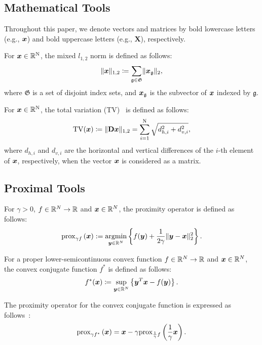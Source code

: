 \subsection{Mathematical Tools} \label{subsec:mathematical-tools}

Throughout this paper, we denote vectors and matrices by bold lowercase letters (e.g., $\bm{x}$) and bold uppercase letters (e.g., $\bm{X}$), respectively.

For $\bm{x} \in \mathbb{R}^{\mathrm{N}}$, the mixed $l_{1,2}$ norm is defined as follows:
\begin{equation} \label{eq:L12NormDefinitionEq} \lVert \bm{x} \rVert _{1,2} \coloneq \sum_{\mathfrak{g} \in \mathfrak{G}} \lVert \bm{x}_\mathfrak{g} \rVert _2, \end{equation}
where $\mathfrak{G}$ is a set of disjoint index sets, and $\bm{x}_{\mathfrak{g}}$ is the subvector of $\bm{x}$ indexed by $\mathfrak{g}$.

For $\bm{x} \in \mathbb{R}^{\mathrm{N}}$, the total variation (TV)~\cite{TV} is defined as follows:
\begin{equation} \label{eq:TVDefinitionEq} \mathrm{TV}(\bm{x}) \coloneq \lVert \mathbf{D} \bm{x} \rVert _{1,2} = \sum_{i=1}^{\mathrm{N}} \sqrt{d_{h,i}^2 + d_{v,i}^2}, \end{equation}
where $d_{h,i}$ and $d_{v,i}$ are the horizontal and vertical differences of the $i$-th element of $\bm{x}$, respectively, when the vector $\bm{x}$ is considered as a matrix.



\subsection{Proximal Tools} \label{subsec:proximal-tools}

For $\gamma > 0$, $f \in \mathbb{R}^N \to \mathbb{R}$ and $\bm{x} \in \mathbb{R}^N$, the proximity operator is defined as follows:
\begin{equation} \label{eq:ProximityOperatorDefinitionEq} \mathrm{prox}_{ \gamma f }\left(\bm{x}\right) := \underset{\bm{y} \in \mathbb{R}^N}{\mathrm{argmin}} \left\{ f(\bm{y}) + \frac{1}{2 \gamma} \lVert \bm{y} - \bm{x} \rVert _2^2 \right\}. \end{equation}

For a proper lower-semicontinuous convex function $f \in \mathbb{R}^N \to \mathbb{R}$ and $\bm{x} \in \mathbb{R}^N$, the convex conjugate function $f^*$ is defined as follows:
\begin{equation} \label{eq:ConjugateFunctionDefinitionEq} f^*(\bm{x}) \coloneq \sup_{\bm{y} \in \mathbb{R}^N} \left\{ \bm{y}^T \bm{x} - f(\bm{y}) \right\}. \end{equation}

The proximity operator for the convex conjugate function is expressed as follows~\cite[Theorem 3.1 (ii)]{prox-convex-conjugate-function}:
\begin{equation} \label{eq:ProximityOperatorDefinitionWithConvexConjugateFunctionEq} \mathrm{prox}_{ \gamma f^* }\left(\bm{x}\right) = \bm{x} - \gamma \mathrm{prox}_{ \frac 1 \gamma f }\left(\frac 1 \gamma \bm{x}\right). \end{equation}

